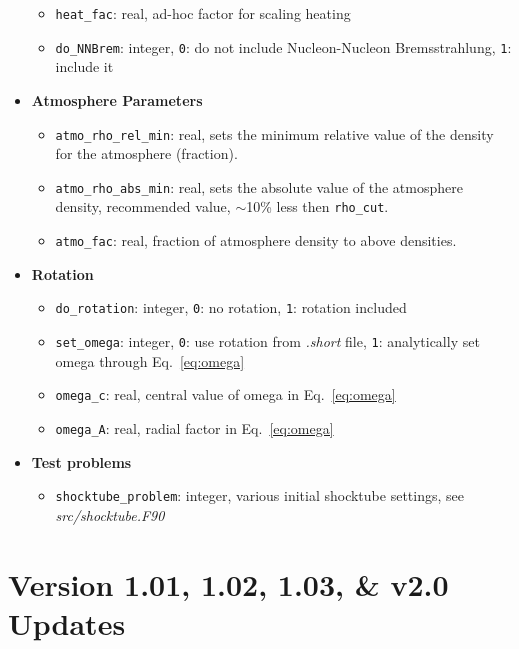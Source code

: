 \documentclass[10pt,nofootinbib]{article}
\newcommand{\code}[1]{\texttt{#1}}
\begin{document}
\begin{itemize}
\begin{itemize}
\item{{\tt heat\_fac}: real, ad-hoc factor for scaling heating}
\item{{\tt do\_NNBrem}: integer, \code{0}: do not include Nucleon-Nucleon Bremsstrahlung, \code{1}: include it}
\end{itemize}
\item{{\bf Atmosphere Parameters}}
\begin{itemize}
\item{{\tt atmo\_rho\_rel\_min}: real, sets the minimum relative value of the density for the atmosphere (fraction).}
\item{{\tt atmo\_rho\_abs\_min}: real, sets the absolute value of the atmosphere density, recommended value, $\sim$10\% less then {\tt rho\_cut}.}
\item{{\tt atmo\_fac}: real, fraction of atmosphere density to above densities.} 
\end{itemize}
\item{{\bf Rotation}}
\begin{itemize}
\item{{\tt do\_rotation}: integer, \code{0}: no rotation, \code{1}: rotation included}
\item{{\tt set\_omega}: integer, \code{0}: use rotation from {\it .short} file, \code{1}: analytically set omega through Eq.~\ref{eq:omega}}
\item{{\tt omega\_c}: real, central value of omega in Eq.~\ref{eq:omega}}
\item{{\tt omega\_A}: real, radial factor in Eq.~\ref{eq:omega}}
\end{itemize}
\item{{\bf Test problems}}
\begin{itemize}
\item{{\tt shocktube\_problem}: integer, various initial shocktube settings, see {\it src/shocktube.F90}}
\end{itemize}
\end{itemize}

\section{Version 1.01, 1.02, 1.03, \& v2.0 Updates}
\end{document}
